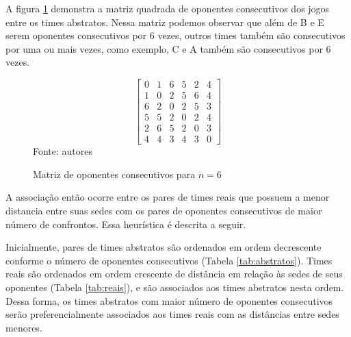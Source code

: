 \documentclass[12pt,a4paper]{article}
\begin{document}
A figura \ref{matriz:consecutivos} demonstra a matriz quadrada de oponentes consecutivos dos jogos entre os times abstratos. Nessa matriz podemos observar que além de B e E serem oponentes consecutivos por 6 vezes, outros times também são consecutivos por uma ou mais vezes, como exemplo, C e A também são consecutivos por 6 vezes.

\begin{figure}[H]
	\centering
	\caption{Matriz de oponentes consecutivos para $n=6$}
	\label{matriz:consecutivos}
	\vspace{-0.7cm}
	\[ \begin{bmatrix}
	0 & 1 & 6 & 5 & 2 & 4 \\
	1 & 0 & 2 & 5 & 6 & 4 \\
	6 & 2 & 0 & 2 & 5 & 3 \\
	5 & 5 & 2 & 0 & 2 & 4 \\
	2 & 6 & 5 & 2 & 0 & 3 \\
	4 & 4 & 3 & 4 & 3 & 0
	\end{bmatrix} \]
	\footnotesize Fonte: autores
\end{figure}

A associação então ocorre entre os pares de times reais que possuem a menor distancia entre suas sedes com os pares de oponentes consecutivos de maior número de confrontos. Essa heurística é descrita a seguir.

Inicialmente, pares de times abstratos são ordenados em ordem decrescente conforme o número de oponentes consecutivos (Tabela \ref{tab:abstratos}). Times reais são ordenados em ordem crescente de distância em relação às sedes de seus oponentes (Tabela \ref{tab:reais}), e são associados aos times abstratos nesta ordem. Dessa forma, os times abstratos com maior número de oponentes consecutivos serão preferencialmente associados aos times reais com as distâncias entre sedes menores.
\end{document}

